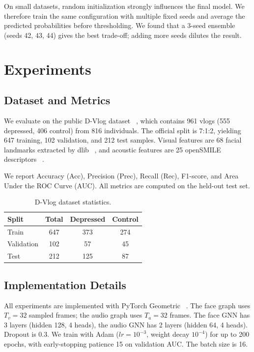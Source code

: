 \documentclass[conference]{IEEEtran}
\begin{document}
On small datasets, random initialization strongly influences the final model.
We therefore train the same configuration with multiple fixed seeds and average the predicted probabilities before thresholding.
We found that a 3-seed ensemble (seeds 42, 43, 44) gives the best trade-off; adding more seeds dilutes the result.

\section{Experiments}
\label{sec:experiments}

\subsection{Dataset and Metrics}

We evaluate on the public D-Vlog dataset~
\cite{yoon2022dvlog}, which contains 961 vlogs (555 depressed, 406 control) from 816 individuals.
The official split is 7:1:2, yielding 647 training, 102 validation, and 212 test samples.
Visual features are 68 facial landmarks extracted by dlib~
\cite{king2009dlib}, and acoustic features are 25 openSMILE descriptors~
\cite{eyben2010opensmile}.

We report Accuracy (Acc), Precision (Prec), Recall (Rec), F1-score, and Area Under the ROC Curve (AUC).
All metrics are computed on the held-out test set.

\begin{table}[t]
\centering
\caption{D-Vlog dataset statistics.}
\label{tab:dataset}
\begin{tabular}{lccc}
\toprule
Split & Total & Depressed & Control \\
\midrule
Train & 647 & 373 & 274 \\
Validation & 102 & 57 & 45 \\
Test & 212 & 125 & 87 \\
\bottomrule
\end{tabular}
\end{table}

\subsection{Implementation Details}

All experiments are implemented with PyTorch Geometric~
\cite{fey2019fast}.
The face graph uses $T_v=32$ sampled frames; the audio graph uses $T_a=32$ frames.
The face GNN has 3 layers (hidden 128, 4 heads), the audio GNN has 2 layers (hidden 64, 4 heads).
Dropout is 0.3.
We train with Adam ($lr=10^{-3}$, weight decay $10^{-4}$) for up to 200 epochs, with early-stopping patience 15 on validation AUC.
The batch size is 16.
\end{document}

